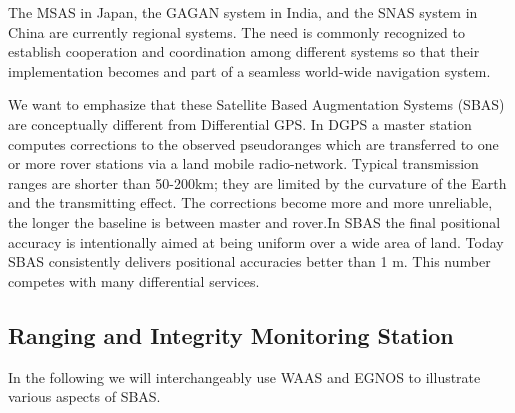 	The MSAS in Japan, the GAGAN system in India, and the SNAS system in China are currently regional systems. The need is commonly recognized to establish cooperation and coordination among different systems so that their implementation becomes and part of a seamless world-wide navigation system.
	
	We want to emphasize that these Satellite Based Augmentation Systems (SBAS) are conceptually different from Differential GPS. In DGPS a master station computes corrections to the observed pseudoranges which are transferred to one or more rover stations via a land mobile radio-network. Typical transmission ranges are shorter than 50-200km; they are limited by the curvature of the Earth and the transmitting effect. The corrections become more and more unreliable, the longer the baseline is between master and rover.In SBAS the final positional accuracy is intentionally aimed at being uniform over a wide area of land. Today SBAS consistently delivers positional accuracies better than 1 m. This number competes with many differential services.
	
	\subsection{Ranging and Integrity Monitoring Station}
		In the following we will interchangeably use WAAS and EGNOS to illustrate various aspects of SBAS.
		
